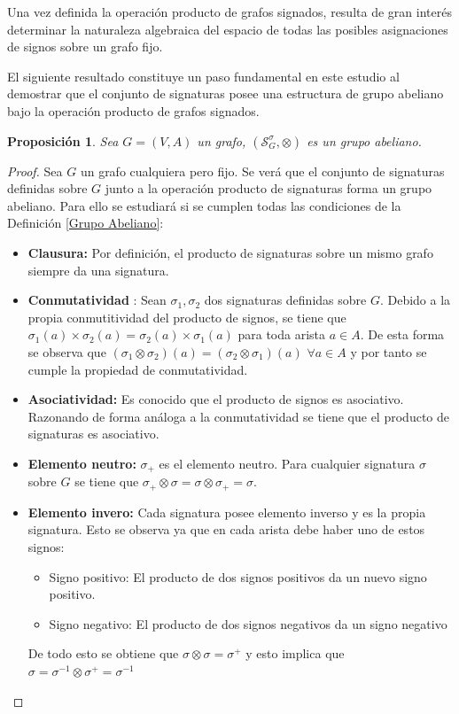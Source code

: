 \documentclass[11pt,a4paper,spanish]{report}
\theoremstyle{plain}
\newtheorem{proposicion}[teorema]{Proposición}
\begin{document}
Una vez definida la operación producto de grafos signados, resulta de gran interés determinar la naturaleza algebraica del espacio de todas las posibles asignaciones de signos sobre un grafo fijo.

El siguiente resultado constituye un paso fundamental en este estudio al demostrar que el conjunto de signaturas posee una estructura de grupo abeliano bajo la operación producto de grafos signados.

\begin{proposicion}\label{abeliano1}
 Sea $G=(V,A)$ un grafo, $(\mathcal{S}^\sigma_G,\otimes)$ es un grupo abeliano.
 
 
\end{proposicion}
\begin{proof} Sea $G$ un grafo cualquiera pero fijo. Se verá que el conjunto de signaturas definidas sobre $G$ junto a la operación producto de signaturas forma un grupo abeliano. Para ello se estudiará si se cumplen todas las condiciones de la Definición \ref{Grupo Abeliano}:

\begin{itemize}


    \item[(i)] \textbf{Clausura:} Por definición, el producto de signaturas sobre un mismo grafo siempre da una signatura.
    \item[(ii)] \textbf{Conmutatividad} : Sean $\sigma_1,\sigma_2$ dos signaturas definidas sobre $G$. 
    Debido a la propia conmutitividad del producto de signos, se tiene que $\sigma_1 (a) \times\sigma_2 (a) = \sigma_2 (a)\times \sigma_1 (a)$ para toda arista $a \in A$. De esta forma se observa que $(\sigma_1 \otimes\sigma_2)(a)=(\sigma_2 \otimes\sigma_1)(a)  $ $\forall a\in A$ y por tanto se cumple la propiedad de conmutatividad.
    
   

\item[(iii)] \textbf{Asociatividad:} Es conocido que el producto de signos es asociativo. Razonando de forma análoga a la conmutatividad se tiene que el producto de  signaturas es asociativo.


    \item[(iv)] \textbf{Elemento neutro:} $\sigma_{+}$ es el elemento neutro. Para cualquier signatura $\sigma$ sobre $G$ se tiene que $\sigma_{+}\otimes\sigma=\sigma\otimes \sigma_{+}=\sigma$.
    \item[(v)] \textbf{Elemento invero:} Cada signatura posee elemento inverso y es la propia signatura. Esto se observa ya que en cada arista debe haber uno de estos signos:
    \begin{itemize}
        \item Signo positivo: El producto de dos signos positivos da un nuevo signo positivo.
        \item Signo negativo: El producto de dos signos negativos da un signo negativo
    \end{itemize}
    De todo esto se obtiene que
    $\sigma \otimes \sigma=\sigma^{+}$  y esto implica que $\sigma = \sigma^{-1}\otimes \sigma^{+}=\sigma^{-1}$
\end{itemize}


\end{proof}
\end{document}
